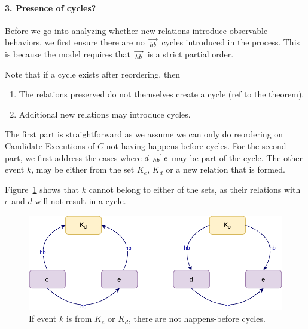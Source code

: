 
\paragraph{3. Presence of cycles?}
    Before we go into analyzing whether new relations introduce observable behaviors, we first ensure there are no $\stackrel{\longrightarrow}{_\textit{hb}}$ cycles introduced in the process. 
    This is because the model requires that $\stackrel{\longrightarrow}{_{hb}}$ is a strict partial order. 
    
    Note that if a cycle exists after reordering, then 
    \begin{enumerate}
        \item The relations preserved do not themselves create a cycle (ref to the theorem).
        \item Additional new relations may introduce cycles.
    \end{enumerate}

    The first part is straightforward as we assume we can only do reordering on Candidate Executions of $C$ not having happens-before cycles. 
    For the second part, we first address the cases where $d\stackrel{\longrightarrow}{_{hb}}e$ may be part of the cycle. 
    The other event $k$, may be either from the set $K_e$, $K_d$ or a new relation that is formed\footnotemark.

    
    Figure~\ref{reord:cycle(a)} shows that $k$ cannot belong to either of the sets, as their relations with $e$ and $d$ will not result in a cycle. 
    \begin{figure}[H]
        \centering
        \includegraphics[scale=0.7]{5.InstructionReordering/4.ValidReorderingCandidate/ProofParts/Part3/part3(b).pdf}
        \caption{If event $k$ is from $K_e$ or $K_d$, there are not happens-before cycles.}
        \label{reord:cycle(a)}
    \end{figure}

